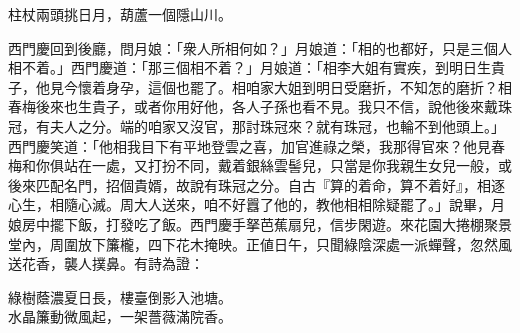 \begin{myquote}
柱杖兩頭挑日月，葫蘆一個隱山川。
\end{myquote}

西門慶回到後廳，問月娘：「衆人所相何如？」月娘道：「相的也都好，只是三個人相不着。」西門慶道：「那三個相不着？」月娘道：「相李大姐有實疾，到明日生貴子，他見今懷着身孕，這個也罷了。相咱家大姐到明日受磨折，不知怎的磨折？相春梅後來也生貴子，或者你用好他，各人子孫也看不見。我只不信，說他後來戴珠冠，有夫人之分。端的咱家又沒官，那討珠冠來？就有珠冠，也輪不到他頭上。」西門慶笑道：「他相我目下有平地登雲之喜，加官進祿之榮，我那得官來？他見春梅和你俱站在一處，又打扮不同，戴着銀絲雲髻兒，只當是你我親生女兒一般，或後來匹配名門，招個貴婿，故說有珠冠之分。{}自古『算的着命，算不着好』，相逐心生，相隨心滅。周大人送來，咱不好囂了他的，教他相相除疑罷了。」說畢，月娘房中擺下飯，打發吃了飯。西門慶手拏芭蕉扇兒，信步閑遊。來花園大捲棚聚景堂內，周圍放下簾櫳，四下花木掩映。正値日午，只聞綠陰深處一派蟬聲，忽然風送花香，襲人撲鼻。有詩為證：

\begin{myquote}
綠樹蔭濃夏日長，樓臺倒影入池塘。\\水晶簾動微風起，一架薔薇滿院香。
\end{myquote}

